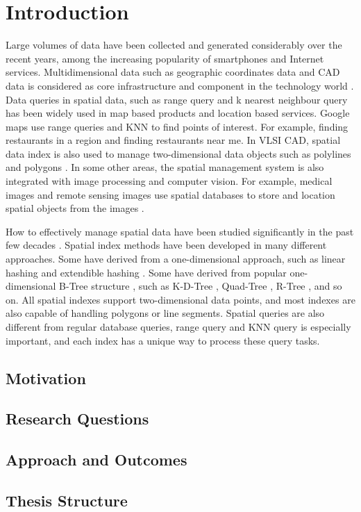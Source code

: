 \chapter{Introduction}

Large volumes of data have been collected and generated considerably over the recent years, among the increasing popularity of smartphones and Internet services. Multidimensional data such as geographic coordinates data and CAD data is considered as core infrastructure and component in the technology world \cite{gunther1990research, morton1966computer}. Data queries in spatial data, such as range query and k nearest neighbour query has been widely used in map based products and location based services. Google maps use range queries and KNN to find points of interest. For example, finding restaurants in a region and finding restaurants near me. In VLSI CAD, spatial data index is also used to manage two-dimensional data objects such as polylines and polygons \cite{liu1994evaluation}. In some other areas, the spatial management system is also integrated with image processing and computer vision. For example, medical images and remote sensing images use spatial databases to store and location spatial objects from the images \cite{borah2004improved, adhikary1996knowledge, mantel2004matching, tagare1997medical}. 

How to effectively manage spatial data have been studied significantly in the past few decades \cite{Gaede:1998fp, ooi1990efficient}. Spatial index methods have been developed in many different approaches. Some have derived from a one-dimensional approach, such as linear hashing \cite{larson1980linear} and extendible hashing \cite{fagin1979extendible}. Some have derived from popular one-dimensional B-Tree structure \cite{Bayer:2002ds}, such as K-D-Tree \cite{Bentley:1975gn}, Quad-Tree \cite{CSUR:tm}, R-Tree \cite{Guttman:1984ka}, and so on. All spatial indexes support two-dimensional data points, and most indexes are also capable of handling polygons or line segments. Spatial queries are also different from regular database queries, range query and KNN query is especially important, and each index has a unique way to process these query tasks. 



\section{Motivation}


\section{Research Questions}


\section{Approach and Outcomes}


\section{Thesis Structure}
